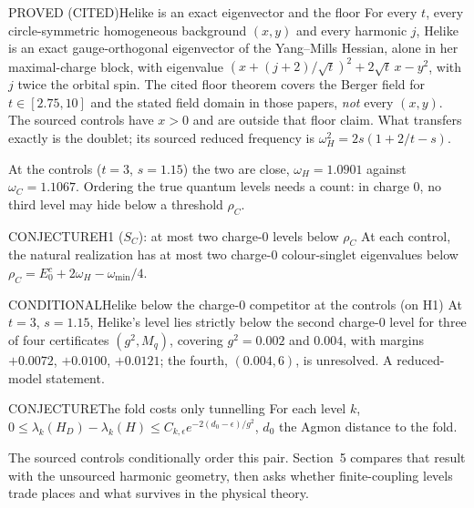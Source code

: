 \begin{claim}{PROVED (CITED)}{Helike is an exact eigenvector and the floor}\label{b:helike}
For every $t$, every circle-symmetric homogeneous background $(x,y)$ and every harmonic $j$, Helike is an exact
gauge-orthogonal eigenvector of the Yang--Mills Hessian, alone in her maximal-charge block, with eigenvalue
$(x+(j+2)/\sqrt t)^2+2\sqrt t\,x-y^2$, with $j$ twice the orbital spin. The cited floor theorem covers the Berger
field for $t\in[2.75,10]$ and the stated field domain in those papers, \emph{not} every $(x,y)$.
The sourced controls have $x>0$ and are outside that floor claim. What transfers exactly is the doublet;
its sourced reduced frequency is $\omega_H^2=2s(1+2/t-s)$.
\end{claim}

At the controls ($t=3$, $s=1.15$) the two are close, $\omega_H=1.0901$ against $\omega_C=1.1067$. Ordering the true
quantum levels needs a count: in charge 0, no third level may hide below a threshold $\rho_C$.

\begin{claim}{CONJECTURE}{H1 ($S_C$): at most two charge-0 levels below $\rho_C$}\label{b:sc}
At each control, the natural realization has at most two charge-0 colour-singlet eigenvalues below
$\rho_C=E_0^c+2\omega_H-\omega_{\min}/4$.
\end{claim}

\begin{claim}{CONDITIONAL}{Helike below the charge-0 competitor at the controls (on H1)}\label{b:order}
At $t=3$, $s=1.15$, Helike's level lies strictly below the second charge-0 level for three of four certificates
$(g^2,M_q)$, covering $g^2=0.002$ and $0.004$, with margins $+0.0072$, $+0.0100$, $+0.0121$; the fourth, $(0.004,6)$, is
unresolved. A reduced-model statement.
\end{claim}

\begin{claim}{CONJECTURE}{The fold costs only tunnelling}\label{b:fold}
For each level $k$, $0\le\lambda_k(H_D)-\lambda_k(H)\le C_{k,\epsilon}e^{-2(d_0-\epsilon)/g^2}$, $d_0$ the Agmon distance
to the fold.
\end{claim}

The sourced controls conditionally order this pair. Section~5 compares that result with the unsourced harmonic
geometry, then asks whether finite-coupling levels trade places and what survives in the physical theory.
